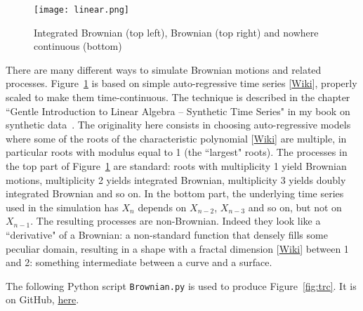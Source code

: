 \documentclass[oneside,10pt]{book}
\begin{document}
\begin{figure}%
\centering
\texttt{[image: linear.png]}
\caption{Integrated Brownian (top left), Brownian (top right) and nowhere continuous (bottom)}
\label{fig:lollog1xx}
\end{figure}

There are many different ways to simulate Brownian motions and related processes. Figure~\ref{fig:lollog1xx} is based on simple
\textcolor{index}{auto-regressive time series} [\href{https://en.wikipedia.org/wiki/Autoregressive_model}{Wiki}], properly scaled to make them time-continuous. The technique is described in the chapter ``Gentle Introduction to Linear Algebra -- Synthetic Time Series" in my book on synthetic data~\cite{vgsynthetic}. The originality here consists in choosing auto-regressive models where  some of the roots of the \textcolor{index}{characteristic polynomial}
 [\href{https://en.wikipedia.org/wiki/Characteristic_polynomial}{Wiki}] are multiple, in particular roots with
modulus equal to 1 (the ``largest" roots). The processes in the top part of Figure~\ref{fig:lollog1xx} are standard: roots with multiplicity 1 yield Brownian motions, multiplicity 2 yields integrated Brownian, multiplicity 3 yields doubly integrated Brownian and so on. In the bottom part, the underlying time series used in the simulation has $X_n$ depends on $X_{n-2}$, $X_{n-3}$ and so on, but not
 on $X_{n-1}$. The resulting processes are non-Brownian. Indeed they look like a ``derivative" of a Brownian: a non-standard function that densely fills some peculiar domain, resulting in a shape with a \textcolor{index}{fractal dimension}
 [\href{https://en.wikipedia.org/wiki/Fractal_dimension}{Wiki}] between 1 and 2: something intermediate between a curve and a surface.

The following Python script \texttt{Brownian.py} is used to produce Figure~\ref{fig:trc}.  It is on
GitHub, \href{https://github.com/VincentGranville/Stochastic-Processes/blob/master/Brownian.py}{here}. \vspace{1ex}

\end{document}
